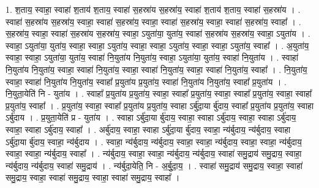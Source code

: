 \documentclass[17pt]{extarticle}
\begin{document}
1. श॒ताय॒ स्वाहा॒ स्वाहा॑ श॒ताय॑ श॒ताय॒ स्वाहा॑ स॒हस्रा॑य स॒हस्रा॑य॒ स्वाहा॑ श॒ताय॑ श॒ताय॒ स्वाहा॑ स॒हस्रा॑य । . स्वाहा॑ स॒हस्रा॑य स॒हस्रा॑य॒ स्वाहा॒ स्वाहा॑ स॒हस्रा॑य॒ स्वाहा॒ स्वाहा॑ स॒हस्रा॑य॒ स्वाहा॒ स्वाहा॑ स॒हस्रा॑य॒ स्वाहा᳚ । . स॒हस्रा॑य॒ स्वाहा॒ स्वाहा॑ स॒हस्रा॑य स॒हस्रा॑य॒ स्वाहा॒ ऽयुता॑या॒ युता॑य॒ स्वाहा॑ स॒हस्रा॑य स॒हस्रा॑य॒ स्वाहा॒ ऽयुता॑य । . स्वाहा॒ ऽयुता॑या॒ युता॑य॒ स्वाहा॒ स्वाहा॒ ऽयुता॑य॒ स्वाहा॒ स्वाहा॒ ऽयुता॑य॒ स्वाहा॒ स्वाहा॒ ऽयुता॑य॒ स्वाहा᳚ । . अ॒युता॑य॒ स्वाहा॒ स्वाहा॒ ऽयुता॑या॒ युता॑य॒ स्वाहा॑ नि॒युता॑य नि॒युता॑य॒ स्वाहा॒ ऽयुता॑या॒ युता॑य॒ स्वाहा॑ नि॒युता॑य । . स्वाहा॑ नि॒युता॑य नि॒युता॑य॒ स्वाहा॒ स्वाहा॑ नि॒युता॑य॒ स्वाहा॒ स्वाहा॑ नि॒युता॑य॒ स्वाहा॒ स्वाहा॑ नि॒युता॑य॒ स्वाहा᳚ । . नि॒युता॑य॒ स्वाहा॒ स्वाहा॑ नि॒युता॑य नि॒युता॑य॒ स्वाहा᳚ प्र॒युता॑य प्र॒युता॑य॒ स्वाहा॑ नि॒युता॑य नि॒युता॑य॒ स्वाहा᳚ प्र॒युता॑य । . नि॒युता॒येति॑ नि - युता॑य । . स्वाहा᳚ प्र॒युता॑य प्र॒युता॑य॒ स्वाहा॒ स्वाहा᳚ प्र॒युता॑य॒ स्वाहा॒ स्वाहा᳚ प्र॒युता॑य॒ स्वाहा॒ स्वाहा᳚ प्र॒युता॑य॒ स्वाहा᳚ । . प्र॒युता॑य॒ स्वाहा॒ स्वाहा᳚ प्र॒युता॑य प्र॒युता॑य॒ स्वाहा ऽर्बु॑दा॒या र्बु॑दाय॒ स्वाहा᳚ प्र॒युता॑य प्र॒युता॑य॒ स्वाहा ऽर्बु॑दाय । . प्र॒युता॒येति॑ प्र - युता॑य । . स्वाहा ऽर्बु॑दा॒या र्बु॑दाय॒ स्वाहा॒ स्वाहा ऽर्बु॑दाय॒ स्वाहा॒ स्वाहा ऽर्बु॑दाय॒ स्वाहा॒ स्वाहा ऽर्बु॑दाय॒ स्वाहा᳚ । . अर्बु॑दाय॒ स्वाहा॒ स्वाहा ऽर्बु॑दा॒या र्बु॑दाय॒ स्वाहा॒ न्य॑र्बुदाय॒ न्य॑र्बुदाय॒ स्वाहा ऽर्बु॑दा॒या र्बु॑दाय॒ स्वाहा॒ न्य॑र्बुदाय । . स्वाहा॒ न्य॑र्बुदाय॒ न्य॑र्बुदाय॒ स्वाहा॒ स्वाहा॒ न्य॑र्बुदाय॒ स्वाहा॒ स्वाहा॒ न्य॑र्बुदाय॒ स्वाहा॒ स्वाहा॒ न्य॑र्बुदाय॒ स्वाहा᳚ । . न्य॑र्बुदाय॒ स्वाहा॒ स्वाहा॒ न्य॑र्बुदाय॒ न्य॑र्बुदाय॒ स्वाहा॑ समु॒द्राय॑ समु॒द्राय॒ स्वाहा॒ न्य॑र्बुदाय॒ न्य॑र्बुदाय॒ स्वाहा॑ समु॒द्राय॑ । . न्य॑र्बुदा॒येति॒ नि - अ॒र्बु॒दा॒य॒ । . स्वाहा॑ समु॒द्राय॑ समु॒द्राय॒ स्वाहा॒ स्वाहा॑ समु॒द्राय॒ स्वाहा॒ स्वाहा॑ समु॒द्राय॒ स्वाहा॒ स्वाहा॑ समु॒द्राय॒ स्वाहा᳚ । \newline
\end{document}
